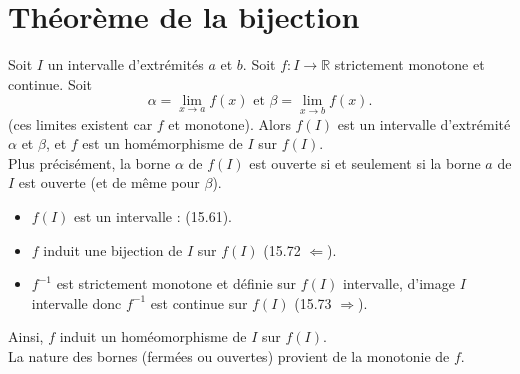 \documentclass[../main.tex]{subfiles}
\begin{document}
\setcounter{section}{75}
\section{Théorème de la bijection}
\begin{tcolorbox}[title=Théorème 15.76, title filled=false, colframe=orange, colback=orange!10!white]
    Soit $I$ un intervalle d'extrémités $a$ et $b$. Soit $f:I\to \mathbb{R}$ strictement monotone et continue. Soit 
    $$\alpha = \lim_{x\to a} f(x) \text{ et } \beta = \lim_{x\to b} f(x).$$
    (ces limites existent car $f$ et monotone). Alors $f(I)$ est un intervalle d'extrémité $\alpha$ et $\beta$, et $f$ est un homémorphisme de $I$ sur $f(I)$. \\
    Plus précisément, la borne $\alpha$ de $f(I)$ est ouverte si et seulement si la borne $a$ de $I$ est ouverte (et de même pour $\beta$). 
\end{tcolorbox}

\begin{itemize}
    \item $f(I)$ est un intervalle : (15.61). 
    \item $f$ induit une bijection de $I$ sur $f(I)$ (15.72 $\boxed{\Leftarrow}$). 
    \item $f^{-1}$ est strictement monotone et définie sur $f(I)$ intervalle, d'image $I$ intervalle donc $f^{-1}$ est continue sur $f(I)$ (15.73 $\boxed{\Rightarrow}$). 
\end{itemize}
Ainsi, $f$ induit un homéomorphisme de $I$ sur $f(I)$. \\
La nature des bornes (fermées ou ouvertes) provient de la monotonie de $f$. 
\end{document}
